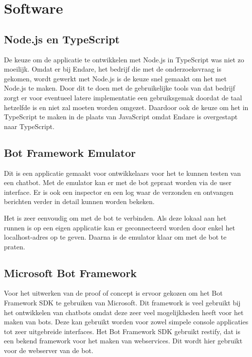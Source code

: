 \section{Software}
\label{sec:POC}

\subsection{Node.js en TypeScript}
\label{ts}

De keuze om de applicatie te ontwikkelen met Node.js in TypeScript was niet zo moeilijk. Omdat er bij Endare, het bedrijf die met de onderzoeksvraag is gekomen, wordt gewerkt met Node.js is de keuze snel gemaakt om het met Node.js te maken. Door dit te doen met de gebruikelijke tools van dat bedrijf zorgt er voor eventueel latere implementatie een gebruiksgemak doordat de taal hetzelfde is en niet zal moeten worden omgezet. Daardoor ook de keuze om het in TypeScript te maken in de plaats van JavaScript omdat Endare is overgestapt naar TypeScript.

\subsection{Bot Framework Emulator}
\label{emulator}

Dit is een applicatie gemaakt voor ontwikkelaars voor het te kunnen testen van een chatbot. Met de emulator kan er met de bot gepraat worden via de user interface. Er is ook een inspector en een log waar de verzonden en ontvangen berichten verder in detail kunnen worden bekeken.

Het is zeer eenvoudig om met de bot te verbinden. Als deze lokaal aan het runnen is op een eigen applicatie kan er geconnecteerd worden door enkel het localhost-adres op te geven. Daarna is de emulator klaar om met de bot te praten.

\subsection{Microsoft Bot Framework}
\label{botFramework}

Voor het uitwerken van de proof of concept is ervoor gekozen om het Bot Framework SDK te gebruiken van Microsoft. Dit framework is veel gebruikt bij het ontwikkelen van chatbots omdat deze zeer veel mogelijkheden heeft voor het maken van bots. Deze kan gebruikt worden voor zowel simpele console applicaties tot zeer uitgebreide interfaces. Het Bot Framework SDK gebruikt restify, dat is een bekend framework voor het maken van webservices. Dit wordt hier gebruikt voor de webserver van de bot.

